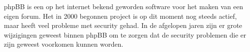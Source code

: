 \samenvatting
phpBB is een op het internet bekend geworden software voor het maken van een eigen forum. Het in 2000\cite{bib.phpbb.history} begonnen project is op dit moment nog steeds actief, maar heeft veel probleme met security gehad. In de afgelopen jaren zijn er grote wijzigingen geweest binnen phpBB om te zorgen dat de security problemen die er zijn geweest voorkomen kunnen worden.
